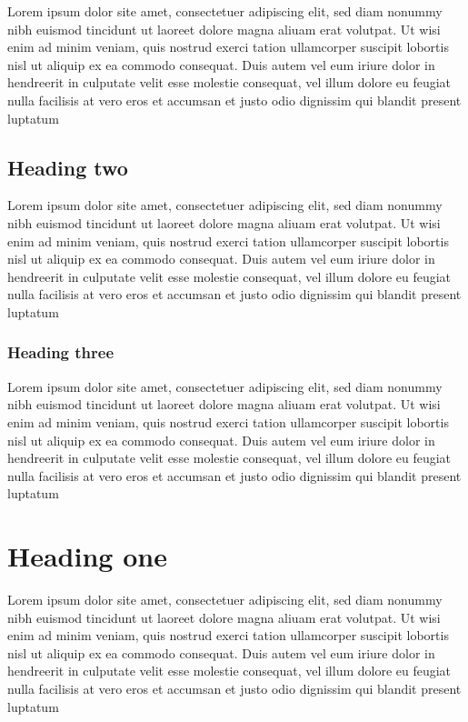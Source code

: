 \documentclass{csnote}
\begin{document}
Lorem ipsum dolor site amet, consectetuer adipiscing elit, sed diam nonummy nibh euismod tincidunt ut laoreet dolore magna aliuam erat volutpat. Ut wisi enim ad minim veniam, quis nostrud exerci tation ullamcorper suscipit lobortis nisl ut aliquip ex ea commodo consequat. Duis autem vel eum iriure dolor in hendreerit in culputate velit esse molestie consequat, vel illum dolore eu feugiat nulla facilisis at vero eros et accumsan et justo odio dignissim qui blandit present luptatum  

\subsection{Heading two}

Lorem ipsum dolor site amet, consectetuer adipiscing elit, sed diam nonummy nibh euismod tincidunt ut laoreet dolore magna aliuam erat volutpat. Ut wisi enim ad minim veniam, quis nostrud exerci tation ullamcorper suscipit lobortis nisl ut aliquip ex ea commodo consequat. Duis autem vel eum iriure dolor in hendreerit in culputate velit esse molestie consequat, vel illum dolore eu feugiat nulla facilisis at vero eros et accumsan et justo odio dignissim qui blandit present luptatum  

\subsubsection{Heading three}

Lorem ipsum dolor site amet, consectetuer adipiscing elit, sed diam nonummy nibh euismod tincidunt ut laoreet dolore magna aliuam erat volutpat. Ut wisi enim ad minim veniam, quis nostrud exerci tation ullamcorper suscipit lobortis nisl ut aliquip ex ea commodo consequat. Duis autem vel eum iriure dolor in hendreerit in culputate velit esse molestie consequat, vel illum dolore eu feugiat nulla facilisis at vero eros et accumsan et justo odio dignissim qui blandit present luptatum  

\section{Heading one}

Lorem ipsum dolor site amet, consectetuer adipiscing elit, sed diam nonummy nibh euismod tincidunt ut laoreet dolore magna aliuam erat volutpat. Ut wisi enim ad minim veniam, quis nostrud exerci tation ullamcorper suscipit lobortis nisl ut aliquip ex ea commodo consequat. Duis autem vel eum iriure dolor in hendreerit in culputate velit esse molestie consequat, vel illum dolore eu feugiat nulla facilisis at vero eros et accumsan et justo odio dignissim qui blandit present luptatum  
\end{document}
